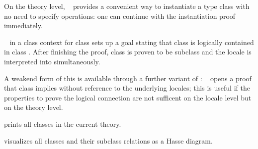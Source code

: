 \begin{isabellebody}
\begin{isamarkuptext}
\begin{description}
  On the theory level, \hyperlink{command.instance}{\mbox{}}~ provides a convenient way to instantiate a type class with no
  need to specify operations: one can continue with the
  instantiation proof immediately.

  \item \hyperlink{command.subclass}{\mbox{}}~ in a class context for class
   sets up a goal stating that class  is logically
  contained in class .  After finishing the proof, class
   is proven to be subclass  and the locale  is interpreted into  simultaneously.

  A weakend form of this is available through a further variant of
  \hyperlink{command.instance}{\mbox{}}:  \hyperlink{command.instance}{\mbox{}}~ opens
  a proof that class  implies  without reference
  to the underlying locales;  this is useful if the properties to prove
  the logical connection are not sufficent on the locale level but on
  the theory level.

  \item \hyperlink{command.print-classes}{\mbox{}} prints all classes in the current
  theory.

  \item \hyperlink{command.class-deps}{\mbox{}} visualizes all classes and their
  subclass relations as a Hasse diagram.


\end{description}
\end{isamarkuptext}
\end{isabellebody}
